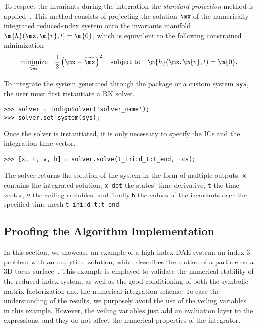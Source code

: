 To respect the invariants during the integration the \emph{standard projection} method is applied~\cite{hairer2000symmetric}. This method consists of projecting the solution $\mx$ of the numerically integrated reduced-index system onto the invariants manifold $\m{h}(\mx, \m{v}, t) = \m{0}$, which is equivalent to the following constrained minimization
%
\begin{equation*}
  \underset{\widetilde{\mx}}{\textrm{minimize}} \quad \dfrac{1}{2}\left(\mx - \widetilde{\mx}\right)^2
    \quad \textrm{subject to} \quad
    \m{h}(\mx, \m{v}, t) = \m{0}.
\end{equation*}

To integrate the system generated through the \Matlab{} package or a custom system \texttt{sys}, the user must first instantiate a \Indigo{} \ac{RK} solver.
%
\begin{verbatim}
>>> solver = IndigoSolver('solver_name');
>>> solver.set_system(sys);
\end{verbatim}
%
Once the solver is instantiated, it is only necessary to specify the \acp{IC} and the integration time vector.
%
\begin{verbatim}
>>> [x, t, v, h] = solver.solve(t_ini:d_t:t_end, ics);
\end{verbatim}
%
The solver returns the solution of the system in the form of multiple outputs: \texttt{x} contains the integrated solution, \texttt{x\_dot} the states' time derivative, \texttt{t} the time vector, \texttt{v} the veiling variables, and finally \texttt{h} the values of the invariants over the specified time mesh \texttt{t\_ini:d\_t:t\_end}.

\subsection{Proofing the Algorithm Implementation}
\label{chap4:sec:example}

In this section, we showcase an example of a high-index \ac{DAE} system: an index-3 problem with an analytical solution, which describes the motion of a particle on a 3D torus surface~\cite{campbell1995constraint}. This example is employed to validate the numerical stability of the reduced-index system, as well as the good conditioning of both the symbolic matrix factorization and the numerical integration scheme. To ease the understanding of the results, we purposely avoid the use of the veiling variables in this example. However, the veiling variables just add an evaluation layer to the expressions, and they do not affect the numerical properties of the integrator.

